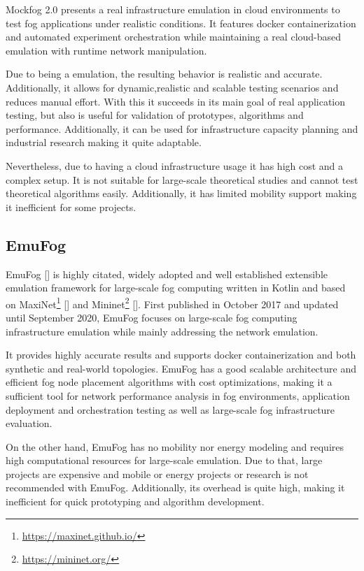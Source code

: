 Mockfog 2.0 presents a real infrastructure emulation in cloud environments to test fog applications under realistic conditions.
It features docker containerization and automated experiment orchestration while maintaining a real cloud-based emulation with runtime network manipulation.

Due to being a emulation, the resulting behavior is realistic and accurate. 
Additionally, it allows for dynamic,realistic and scalable testing scenarios and reduces manual effort.
With this it succeeds in its main goal of real application testing, but also is useful for validation of prototypes, algorithms and performance.
Additionally, it can be used for infrastructure capacity planning and industrial research making it quite adaptable.

Nevertheless, due to having a cloud infrastructure usage it has high cost and a complex setup.
It is not suitable for large-scale theoretical studies and cannot test theoretical algorithms easily.
Additionally, it has limited mobility support making it inefficient for some projects.

\subsection{EmuFog}
EmuFog [\cite{sim-emufog}] is highly citated, widely adopted and well established extensible emulation framework for large-scale fog computing written in Kotlin and based on MaxiNet\footnote{\url{https://maxinet.github.io/}} [\cite{sim-base-maxinet}] and Mininet\footnote{\url{https://mininet.org/}} [\cite{sim-base-mininet}].
First published in October 2017 and updated until September 2020, EmuFog focuses on large-scale fog computing infrastructure emulation while mainly addressing the network emulation.

It provides highly accurate results and supports docker containerization and both synthetic and real-world topologies.
EmuFog has a good scalable architecture and efficient fog node placement algorithms with cost optimizations, making it a sufficient tool for network performance analysis 
in fog environments, application deployment and orchestration testing as well as large-scale fog infrastructure evaluation.

On the other hand, EmuFog has no mobility nor energy modeling and requires high computational resources for large-scale emulation.
Due to that, large projects are expensive and mobile or energy projects or research is not recommended with EmuFog.
Additionally, its overhead is quite high, making it inefficient for quick prototyping and algorithm development.

